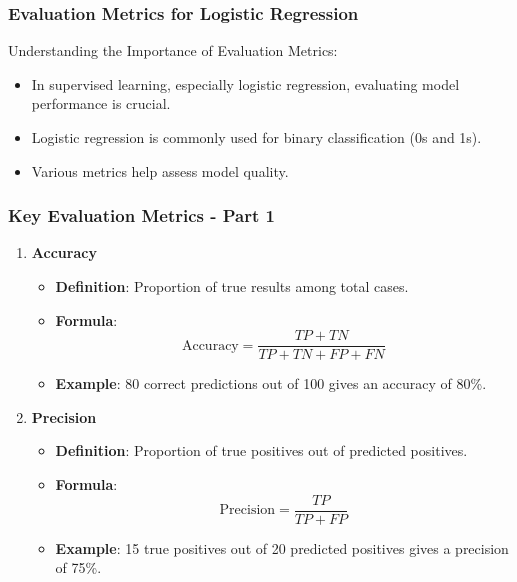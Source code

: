 \documentclass[aspectratio=169]{beamer}
\begin{document}
\begin{frame}[fragile]
    \frametitle{Evaluation Metrics for Logistic Regression}
    Understanding the Importance of Evaluation Metrics:
    \begin{itemize}
        \item In supervised learning, especially logistic regression, evaluating model performance is crucial.
        \item Logistic regression is commonly used for binary classification (0s and 1s).
        \item Various metrics help assess model quality.
    \end{itemize}
\end{frame}

\begin{frame}[fragile]
    \frametitle{Key Evaluation Metrics - Part 1}
    \begin{enumerate}
        \item \textbf{Accuracy}
        \begin{itemize}
            \item \textbf{Definition}: Proportion of true results among total cases.
            \item \textbf{Formula}:
            \begin{equation}
            \text{Accuracy} = \frac{TP + TN}{TP + TN + FP + FN}
            \end{equation}
            \item \textbf{Example}: 80 correct predictions out of 100 gives an accuracy of 80\%.
        \end{itemize}
        
        \item \textbf{Precision}
        \begin{itemize}
            \item \textbf{Definition}: Proportion of true positives out of predicted positives.
            \item \textbf{Formula}:
            \begin{equation}
            \text{Precision} = \frac{TP}{TP + FP}
            \end{equation}
            \item \textbf{Example}: 15 true positives out of 20 predicted positives gives a precision of 75\%.
        \end{itemize}        
    \end{enumerate}
\end{frame}
\end{document}
